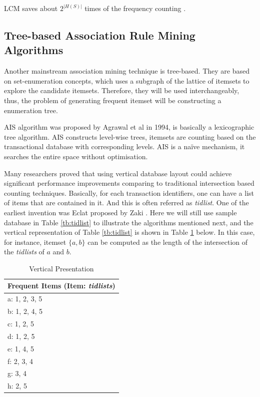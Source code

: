 LCM saves about $2^{|H(S)|}$ times of the frequency counting \cite{LCM}.

\subsection{Tree-based Association Rule Mining Algorithms}

Another mainstream association mining technique is tree-based. They are based on set-enumeration concepts, which uses a subgraph of the lattice of itemsets to explore the candidate itemsets. Therefore, they will be used interchangeably, thus, the problem of generating frequent itemset will be constructing a enumeration tree.

\begin{definition}
\label{AIS}
AIS algorithm was proposed by Agrawal et al \cite{arm2} in 1994, is basically a lexicographic tree algorithm. AIS constructs level-wise trees, itemsets are counting based on the transactional database with corresponding levels. AIS is a na\"ive mechanism, it searches the entire space without optimisation. 
\end{definition}

Many researchers proved that using vertical database layout could achieve significant performance improvements comparing to traditional intersection based counting techniques. Basically, for each transaction identifiers, one can have a list of items that are contained in it. And this is often referred as \textit{tidlist}. One of the earliest invention was Eclat proposed by Zaki \cite{eclat}. Here we will still use sample database in Table \ref{tb:tidlist} to illustrate the algorithms mentioned next, and the vertical representation of Table \ref{tb:tidlist} is shown in Table \ref{tb:tidlistvert} below. In this case, for instance, itemset $\{a,b\}$ can be computed as the length of the intersection of the \textit{tidlists} of $a$ and $b$.

\begin{table}[h!]
\caption{Vertical Presentation}
\label{tb:tidlistvert}
\centering
 \begin{tabular}{p{4cm}} 
 \hline\hline
 \multicolumn{1}{c}{Frequent Items (Item: \textit{tidlists})}\\
 \hline
 a: 1, 2, 3, 5 \\ 
 b: 1, 2, 4, 5 \\
 c: 1, 2, 5 \\
 d: 1, 2, 5 \\
 e: 1, 4, 5 \\
 f: 2, 3, 4\\
 g: 3, 4\\
 h: 2, 5\\
 \hline
\end{tabular}
\end{table}

